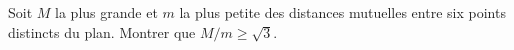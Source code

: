 Soit $M$ la plus grande et $m$ la plus petite des distances mutuelles entre six points distincts du plan. Montrer que $M/m \geq \sqrt{3}$.
